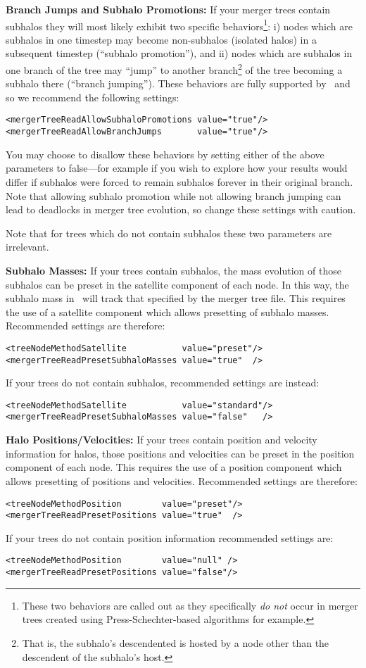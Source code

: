 {\bf Branch Jumps and Subhalo Promotions:} If your merger trees contain subhalos they will most likely exhibit two specific behaviors\footnote{These two behaviors are called out as they specifically \emph{do not} occur in merger trees created using Press-Schechter-based algorithms for example.}: i) \glspl{node} which are subhalos in one timestep may become non-subhalos (isolated halos) in a subsequent timestep (``subhalo promotion''), and ii) \glspl{node} which are subhalos in one branch of the tree may ``jump'' to another branch\footnote{That is, the subhalo's descendented is hosted by a \gls{node} other than the descendent of the subhalo's host.} of the tree becoming a subhalo there (``branch jumping''). These behaviors are fully supported by \glc\ and so we recommend the following settings:
\begin{verbatim}
<mergerTreeReadAllowSubhaloPromotions value="true"/>
<mergerTreeReadAllowBranchJumps       value="true"/>
\end{verbatim}
You may choose to disallow these behaviors by setting either of the above parameters to {\normalfont \ttfamily false}---for example if you wish to explore how your results would differ if subhalos were forced to remain subhalos forever in their original branch. Note that allowing subhalo promotion while not allowing branch jumping can lead to \glspl{deadlock} in merger tree evolution, so change these settings with caution.

Note that for trees which do not contain subhalos these two parameters are irrelevant.

{\bf Subhalo Masses:} If your trees contain subhalos, the mass evolution of those subhalos can be preset in the satellite component of each \gls{node}. In this way, the subhalo mass in \glc\ will track that specified by the merger tree file. This requires the use of a satellite component which allows presetting of subhalo masses. Recommended settings are therefore:
\begin{verbatim}
<treeNodeMethodSatellite           value="preset"/>
<mergerTreeReadPresetSubhaloMasses value="true"  />
\end{verbatim}
If your trees do not contain subhalos, recommended settings are instead:
\begin{verbatim}
<treeNodeMethodSatellite           value="standard"/>
<mergerTreeReadPresetSubhaloMasses value="false"   />
\end{verbatim}

{\bf Halo Positions/Velocities:} If your trees contain position and velocity information for halos, those positions and velocities can be preset in the position component of each \gls{node}. This requires the use of a position component which allows presetting of positions and velocities. Recommended settings are therefore:
\begin{verbatim}
<treeNodeMethodPosition        value="preset"/>
<mergerTreeReadPresetPositions value="true"  />
\end{verbatim}
If your trees do not contain position information recommended settings are:
\begin{verbatim}
<treeNodeMethodPosition        value="null" />
<mergerTreeReadPresetPositions value="false"/>
\end{verbatim}

